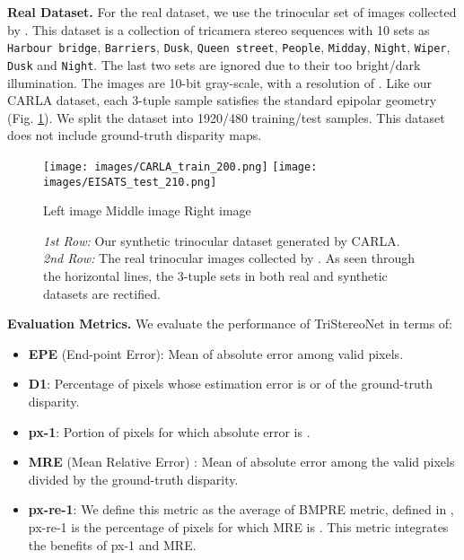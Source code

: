 \documentclass[10pt,twocolumn,letterpaper]{article}
\begin{document}
\noindent\textbf{Real Dataset.} For the real dataset, we use the trinocular set of images collected by \cite{HER11,SCH11}. This dataset is a collection of tricamera stereo sequences with 10 sets as {\tt{Harbour bridge}}, {\tt{Barriers}}, {\tt{Dusk}}, {\tt{Queen street}}, {\tt{People}}, {\tt{Midday}}, {\tt{Night}}, {\tt{Wiper}}, {\tt{Dusk}} and {\tt{Night}}. The last two sets are ignored due to their too bright/dark illumination. The images are 10-bit gray-scale, with a resolution of . Like our CARLA dataset, each 3-tuple sample satisfies the standard epipolar geometry (Fig. \ref{fig:datasets}). We split the dataset into 1920/480 training/test samples. This dataset does not include ground-truth disparity maps.
\begin{figure}[t]
	\begin{center}
		\texttt{[image: images/CARLA\_train\_200.png]}	
		\texttt{[image: images/EISATS\_test\_210.png]}	
		\begin{minipage}[c]{1\linewidth}
			\begin{center}
				\footnotesize{\hspace{0.2cm}Left image \hspace{1.2cm} Middle image \hspace{1.2cm} Right image}	
			\end{center}	
		\end{minipage}
	\end{center}
	\vspace{-0.6cm}
	\caption{\emph{1st Row:} Our synthetic trinocular dataset generated by CARLA. \emph{2nd Row:} The real trinocular images collected by \cite{HER11,SCH11}. As seen through the horizontal lines, the 3-tuple sets in both  real and synthetic datasets are rectified.}
	\label{fig:datasets}
\end{figure} 
\noindent\textbf{Evaluation Metrics.} We evaluate the performance of TriStereoNet in terms of:
\begin{itemize}[noitemsep,topsep=0pt,leftmargin=*]
	\item \textbf{EPE} (End-point Error): Mean of absolute error among valid pixels.
	\item \textbf{D1}: Percentage of pixels whose estimation error is  or  of the ground-truth disparity.
	\item \textbf{px-1}: Portion of pixels for which absolute error is .
	\item \textbf{MRE} (Mean Relative Error) \cite{van2006real}: Mean of absolute error among the valid pixels divided by the ground-truth disparity.
	\item \textbf{px-re-1}: We define this metric as the average of BMPRE metric, defined in \cite{cabezas2012bmpre}, \ie px-re-1 is the percentage of pixels for which MRE is . This metric integrates the benefits of px-1 and MRE. 
\end{itemize}
\end{document}
